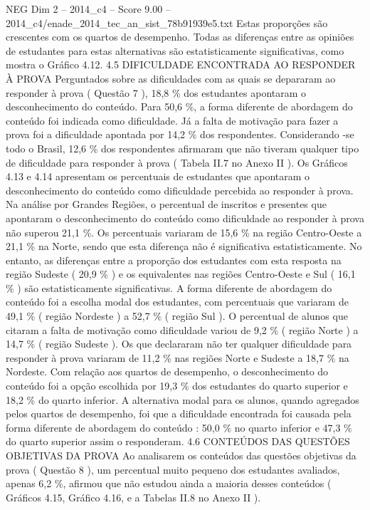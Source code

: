 \begin{textsample}{NEG Dim 2 – 2014\_c4 – Score 9.00 – 2014\_c4/enade\_2014\_tec\_an\_sist\_78b91939e5.txt}
Estas proporções são crescentes com os quartos de desempenho.
Todas as diferenças entre as opiniões de estudantes para estas alternativas são estatisticamente significativas, como mostra o Gráfico 4.12. 4.5 DIFICULDADE ENCONTRADA AO RESPONDER À PROVA Perguntados sobre as dificuldades com as quais se depararam ao responder à prova ( Questão 7 ), 18,8 \% dos estudantes apontaram o desconhecimento do conteúdo.
Para 50,6 \%, a forma diferente de abordagem do conteúdo foi indicada como dificuldade.
Já a falta de motivação para fazer a prova foi a dificuldade apontada por 14,2 \% dos respondentes.
Considerando -se todo o Brasil, 12,6 \% dos respondentes afirmaram que não tiveram qualquer tipo de dificuldade para responder à prova ( Tabela II.7 no Anexo II ).
Os Gráficos 4.13 e 4.14 apresentam os percentuais de estudantes que apontaram o desconhecimento do conteúdo como dificuldade percebida ao responder à prova.
Na análise por Grandes Regiões, o percentual de inscritos e presentes que apontaram o desconhecimento do conteúdo como dificuldade ao responder à prova não superou 21,1 \%.
Os percentuais variaram de 15,6 \% na região Centro-Oeste a 21,1 \% na Norte, sendo que esta diferença não é significativa estatisticamente.
No entanto, as diferenças entre a proporção dos estudantes com esta resposta na região Sudeste ( 20,9 \% ) e os equivalentes nas regiões Centro-Oeste e Sul ( 16,1 \% ) são estatisticamente significativas.
A forma diferente de abordagem do conteúdo foi a escolha modal dos estudantes, com percentuais que variaram de 49,1 \% ( região Nordeste ) a 52,7 \% ( região Sul ).
O percentual de alunos que citaram a falta de motivação como dificuldade variou de 9,2 \% ( região Norte ) a 14,7 \% ( região Sudeste ).
Os que declararam não ter qualquer dificuldade para responder à prova variaram de 11,2 \% nas regiões Norte e Sudeste a 18,7 \% na Nordeste.
Com relação aos quartos de desempenho, o desconhecimento do conteúdo foi a opção escolhida por 19,3 \% dos estudantes do quarto superior e 18,2 \% do quarto inferior.
A alternativa modal para os alunos, quando agregados pelos quartos de desempenho, foi que a dificuldade encontrada foi causada pela forma diferente de abordagem do conteúdo : 50,0 \% no quarto inferior e 47,3 \% do quarto superior assim o responderam. 4.6 CONTEÚDOS DAS QUESTÕES OBJETIVAS DA PROVA Ao analisarem os conteúdos das questões objetivas da prova ( Questão 8 ), um percentual muito pequeno dos estudantes avaliados, apenas 6,2 \%, afirmou que não estudou ainda a maioria desses conteúdos ( Gráficos 4.15, Gráfico 4.16, e a Tabelas II.8 no Anexo II ).

\end{textsample}
